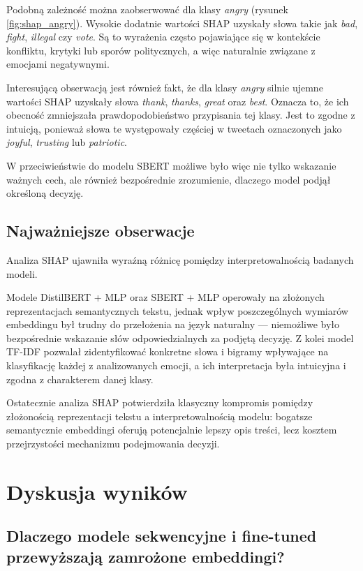 \documentclass[a4paper,12pt]{article}
\begin{document}
Podobną zależność można zaobserwować dla klasy \textit{angry} (rysunek \ref{fig:shap_angry}). Wysokie dodatnie wartości SHAP uzyskały słowa takie jak \textit{bad}, \textit{fight}, \textit{illegal} czy \textit{vote}. Są to wyrażenia często pojawiające się w kontekście konfliktu, krytyki lub sporów politycznych, a więc naturalnie związane z emocjami negatywnymi.

Interesującą obserwacją jest również fakt, że dla klasy \textit{angry} silnie ujemne wartości SHAP uzyskały słowa \textit{thank}, \textit{thanks}, \textit{great} oraz \textit{best}. Oznacza to, że ich obecność zmniejszała prawdopodobieństwo przypisania tej klasy. Jest to zgodne z intuicją, ponieważ słowa te występowały częściej w tweetach oznaczonych jako \textit{joyful}, \textit{trusting} lub \textit{patriotic}.

W przeciwieństwie do modelu SBERT możliwe było więc nie tylko wskazanie ważnych cech, ale również bezpośrednie zrozumienie, dlaczego model podjął określoną decyzję.

\subsection{Najważniejsze obserwacje}

Analiza SHAP ujawniła wyraźną różnicę pomiędzy interpretowalnością badanych modeli.

Modele DistilBERT + MLP oraz SBERT + MLP operowały na złożonych reprezentacjach semantycznych tekstu, jednak wpływ poszczególnych wymiarów embeddingu był trudny do przełożenia na język naturalny — niemożliwe było bezpośrednie wskazanie słów odpowiedzialnych za podjętą decyzję. Z kolei model TF-IDF pozwalał zidentyfikować konkretne słowa i bigramy wpływające na klasyfikację każdej z analizowanych emocji, a ich interpretacja była intuicyjna i zgodna z charakterem danej klasy.

Ostatecznie analiza SHAP potwierdziła klasyczny kompromis pomiędzy złożonością reprezentacji tekstu a interpretowalnością modelu: bogatsze semantycznie embeddingi oferują potencjalnie lepszy opis treści, lecz kosztem przejrzystości mechanizmu podejmowania decyzji.


\section{Dyskusja wyników}

\subsection{Dlaczego modele sekwencyjne i fine-tuned przewyższają zamrożone embeddingi?}
\end{document}
